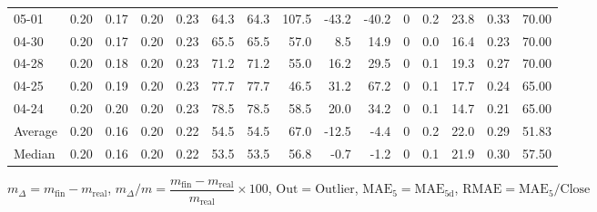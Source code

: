 \begin{threeparttable}
{\begin{tabular}{lrrrrrrrrrrrrrr}
  05-01 &          0.20 &          0.17 &          0.20 &        0.23 &                64.3 &               64.3 &               107.5 &      -43.2 &        -40.2 &              0 &                 0.2 &             23.8 &            0.33 &                  70.00 \\
  04-30 &          0.20 &          0.17 &          0.20 &        0.23 &                65.5 &               65.5 &                57.0 &        8.5 &         14.9 &              0 &                 0.0 &             16.4 &            0.23 &                  70.00 \\
  04-28 &          0.20 &          0.18 &          0.20 &        0.23 &                71.2 &               71.2 &                55.0 &       16.2 &         29.5 &              0 &                 0.1 &             19.3 &            0.27 &                  70.00 \\
  04-25 &          0.20 &          0.19 &          0.20 &        0.23 &                77.7 &               77.7 &                46.5 &       31.2 &         67.2 &              0 &                 0.1 &             17.7 &            0.24 &                  65.00 \\
  04-24 &          0.20 &          0.20 &          0.20 &        0.23 &                78.5 &               78.5 &                58.5 &       20.0 &         34.2 &              0 &                 0.1 &             14.7 &            0.21 &                  65.00 \\
Average &          0.20 &          0.16 &          0.20 &        0.22 &                54.5 &               54.5 &                67.0 &      -12.5 &         -4.4 &              0 &                 0.2 &             22.0 &            0.29 &                  51.83 \\
 Median &          0.20 &          0.16 &          0.20 &        0.22 &                53.5 &               53.5 &                56.8 &       -0.7 &         -1.2 &              0 &                 0.1 &             21.9 &            0.30 &                  57.50 \\
\bottomrule
\end{tabular}
}
\begin{tablenotes}\footnotesize
\item $m_\Delta=m_{\text{fin}}-m_{\text{real}}$,
$m_\Delta/m=\dfrac{m_{\text{fin}}-m_{\text{real}}}{m_{\text{real}}}\times100$,
$\mathrm{Out}=\text{Outlier}$,
$\mathrm{MAE}_5=\mathrm{MAE}_{5\text{d}}$,
$\mathrm{RMAE}=\mathrm{MAE}_5/\text{Close}$
\end{tablenotes}
\end{threeparttable}
\endgroup

